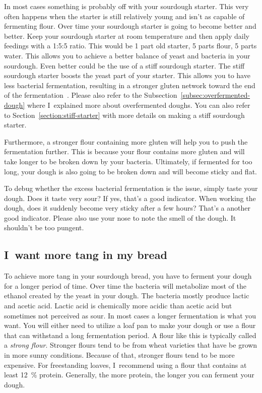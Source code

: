In most cases something is probably off with your
sourdough starter. This very often happens when the starter
is still relatively young and isn't as capable of
fermenting flour. Over time your sourdough
starter is going to become better and better.
Keep your sourdough starter at room temperature
and then apply daily feedings with a 1:5:5 ratio.
This would be 1 part old starter, 5 parts flour,
5 parts water. This allows you to achieve a better
balance of yeast and bacteria in your sourdough.
Even better could be the use of a stiff sourdough
starter. The stiff sourdough starter boosts
the yeast part of your starter. This allows you
to have less bacterial fermentation, resulting
in a stronger gluten network toward the end
of the fermentation~\cite{stiff+starter}. Please
also refer to the Subsection~\ref{subsec:overfermented-dough} where
I~explained more about overfermented doughs. You can also
refer to Section~\ref{section:stiff-starter} with more details on
making a stiff sourdough starter.

Furthermore, a stronger flour containing more gluten
will help you to push the fermentation further. This
is because your flour contains more gluten and will
take longer to be broken down by your bacteria. Ultimately,
if fermented for too long, your dough is also going
to be broken down and will become sticky and flat.

To debug whether the excess bacterial fermentation is the issue,
simply taste your dough. Does it taste very sour? If yes,
that's a good indicator. When working the dough, does it
suddenly become very sticky after a few hours? That's a
another good indicator. Please also use your nose to note
the smell of the dough. It shouldn't be too pungent.

\subsection{I~want more tang in my bread}

To achieve more tang in your sourdough bread, you have
to ferment your dough for a longer period of time.
Over time the bacteria will metabolize most of the
ethanol created by the yeast in your dough. The bacteria
mostly produce lactic and acetic acid. Lactic acid
is chemically more acidic than acetic acid but sometimes
not perceived as sour. In most cases a longer fermentation
is what you want. You will either need to utilize a loaf
pan to make your dough or use a flour that can withstand
a long fermentation period. A flour like this is typically
called a \emph{strong flour}. Stronger flours tend
to be from wheat varieties that have be grown in more
sunny conditions. Because of that, stronger flours tend
to be more expensive. For freestanding loaves, I~recommend
using a flour that contains at least \qty{12}{\percent} protein.
Generally, the more protein, the longer you can ferment your dough.

